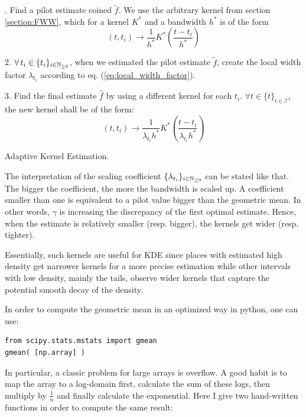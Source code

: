 \documentclass[11pt]{book}
\newcommand{\sequence}[1]{\{ #1 \}_{ i \in \N} }
\newcommand{\sequencetime}{\{t\}_{t \in \mathcal I} }
\begin{document}
\begin{algorithm}[H]
\label{algo:adaptive1}
. \quad Find a pilot estimate coined $\widetilde{f}$. We use the arbitrary kernel from section \ref{section:FWW}, which for a kernel $K^*$ and a bandwidth $h^*$ is of the form $$ (t, t_i) \to \frac 1 {h^*} K^* \left ( \frac{t - t_i}{h^*} \right ) $$ 

2. \quad $\forall t_i \in \sequence{t_i}$, when we estimated the pilot estimate $\widetilde{f}$, create the local width factor $\lambda_{t_i}$ according to eq. (\ref{eq:local_width_factor}). 

3. \quad Find the final estimate $\hat{f}$ by using a different kernel for each $t_i$. $\forall t \in \sequencetime $, the new kernel shall be of the form:
$$ (t, t_i) \to \frac 1 {\lambda_{t_i} h^*} K^* \left ( \frac{t - t_i}{\lambda_{t_i} h^*} \right )$$ 
\caption{Adaptive Kernel Estimation.}
\end{algorithm}












\begin{remarque}
The interpretation of the scaling coefficient $\sequence{\lambda_{t_i}}$ can be stated like that. The bigger the coefficient, the more the bandwidth is scaled up. A coefficient smaller than one is equivalent to a pilot value bigger than the geometric mean. In other words, $\gamma$ is increasing the discrepancy of the first optimal estimate. Hence, when the estimate is relatively smaller (resp. bigger), the kernels get wider (resp. tighter). 

Essentially, such kernels are useful for KDE since places with estimated high density get narrower kernels for a more precise estimation while other intervals with low density, mainly the tails, observe wider kernels that capture the potential smooth decay of the density. 
\end{remarque}



In order to compute the geometric mean in an optimized way in python, one can use:

\begin{verbatim}
from scipy.stats.mstats import gmean
gmean( [np.array] )
\end{verbatim}

In particular, a classic problem for large arrays is overflow. A good habit is to map the array to a log-domain first, calculate the sum of these logs, then multiply by $\frac 1 n$ and finally calculate the exponential. Here I give two hand-written functions in order to compute the same result:
\end{document}
